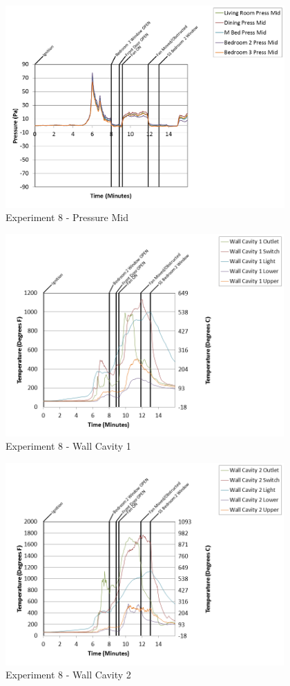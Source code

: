 \documentclass{article}
\begin{document}
\begin{appendices}
\begin{figure}[h!]
	\centering
	\includegraphics[height=3.05in]{0_Images/Results_Charts/Exp_8_Charts/PressureMid.png}
	\caption{Experiment 8 - Pressure Mid}
\end{figure}

\clearpage

\begin{figure}[h!]
	\centering
	\includegraphics[height=3.05in]{0_Images/Results_Charts/Exp_8_Charts/WallCavity1.png}
	\caption{Experiment 8 - Wall Cavity 1}
\end{figure}


\begin{figure}[h!]
	\centering
	\includegraphics[height=3.05in]{0_Images/Results_Charts/Exp_8_Charts/WallCavity2.png}
	\caption{Experiment 8 - Wall Cavity 2}
\end{figure}


\end{appendices}
\end{document}

